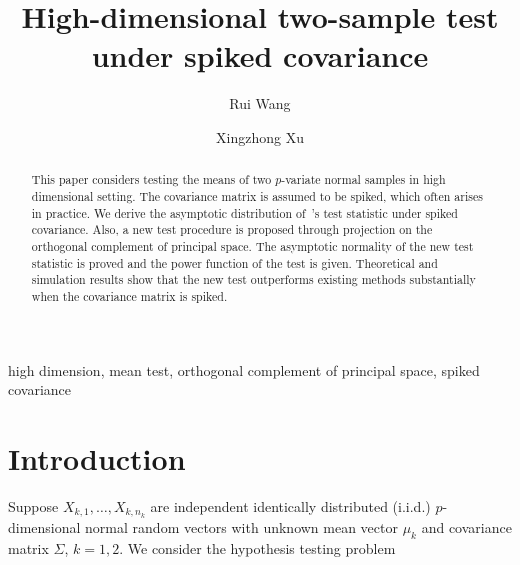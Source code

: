 \documentclass[review]{elsarticle}
\theoremstyle{plain}
\theoremstyle{definition}
\theoremstyle{remark}
\begin{document}
\begin{frontmatter}

\title{High-dimensional two-sample test under spiked covariance}

    \author[mymainaddress]{Rui Wang}
    \author[mymainaddress,mysecondaryaddress]{Xingzhong Xu}
    \address[mymainaddress]{School of Mathematics and Statistics, Beijing Institute of Technology, Beijing 
    100081,China}
    \address[mysecondaryaddress]{Beijing Key Laboratory on MCAACI, Beijing Institute of Technology, Beijing 100081,China}




\begin{abstract}
    This paper considers testing the means of two $p$-variate normal samples in high dimensional setting.
    The covariance matrix is assumed to be spiked, which often arises in practice. 
    We derive the asymptotic distribution of~\cite{Chen2010A}'s test statistic under spiked covariance.
    Also, a new test procedure is proposed through projection on the orthogonal complement of principal space.
    The asymptotic normality of the new test statistic is proved and the power function of the test is given.
    Theoretical and simulation results show that the new test outperforms existing methods substantially when the covariance matrix is spiked.
\end{abstract}

\begin{keyword}
    high dimension, mean test, orthogonal complement of principal space, spiked covariance
\end{keyword}

\end{frontmatter}




\section{Introduction}

Suppose $X_{k,1},\ldots,X_{k,n_k}$  are independent identically distributed (i.i.d.) $p$-dimensional normal random vectors with unknown mean vector $\mu_k$ and covariance matrix $\Sigma$, $k=1,2$. We consider the hypothesis testing problem
\end{document}
